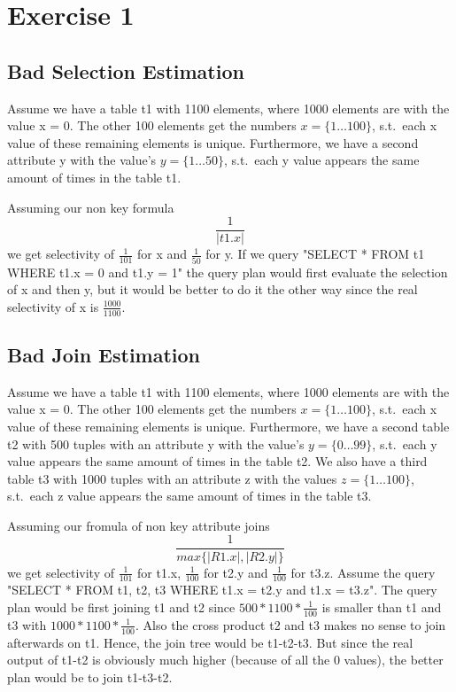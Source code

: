 \documentclass{scrartcl}
\begin{document}
\section*{Exercise 1}

\subsection*{Bad Selection Estimation}
Assume we have a table t1 with 1100 elements, where 1000 elements are with the value x = 0. The other 100 elements get
the numbers $x = \{1\dots100\}$, s.t.\ each x value of these remaining elements is unique. Furthermore, we have a second
attribute y with the value's $y = \{1\dots50\}$, s.t.\ each y value appears the same amount of times in the table t1.

Assuming our non key formula $$\frac{1}{|t1.x|}$$ we get selectivity of $\frac{1}{101}$ for x and $\frac{1}{50}$ for y.
If we query "SELECT * FROM t1 WHERE t1.x = 0 and t1.y = 1" the query plan would first evaluate the selection of x and
then y, but it would be better to do it the other way since the real selectivity of x is $\frac{1000}{1100}$.

\subsection*{Bad Join Estimation}
Assume we have a table t1 with 1100 elements, where 1000 elements are with the value x = 0. The other 100 elements get
the numbers $x = \{1\dots100\}$, s.t.\ each x value of these remaining elements is unique. Furthermore, we have a second
table t2 with 500 tuples with an attribute y with the value's $y = \{0\dots99\}$, s.t.\ each y value appears the same
amount of times in the table t2. We also have a third table t3 with 1000 tuples with an attribute z with the values
$z = \{1\dots100\}$, s.t.\ each z value appears the same amount of times in the table t3.


Assuming our fromula of non key attribute joins
$$\frac{1}{max\{|R1.x|, |R2.y|\}}$$ we get selectivity of $\frac{1}{101}$ for t1.x, $\frac{1}{100}$ for t2.y and
$\frac{1}{100}$ for t3.z. Assume the query "SELECT * FROM t1, t2, t3 WHERE t1.x = t2.y and t1.x = t3.z". The query plan
would be first joining t1 and t2 since $500*1100 * \frac{1}{100}$ is smaller than t1 and t3 with
$1000*1100 * \frac{1}{100}$. Also the cross product t2 and t3 makes no sense to join afterwards on t1.
Hence, the join tree would be t1-t2-t3. But since the real output of t1-t2 is obviously much higher (because of all
the 0 values), the better plan would be to join t1-t3-t2.
\end{document}
